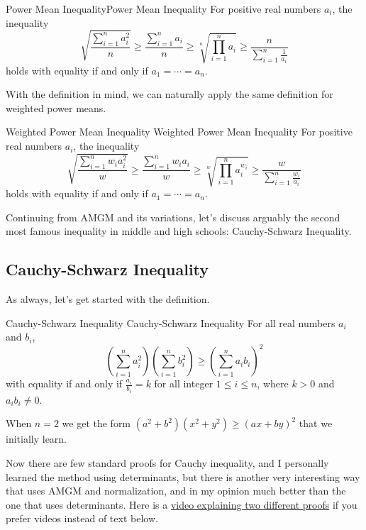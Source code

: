 \documentclass[../../../main.tex]{subfiles}
\begin{document}
\begin{definition}{Power Mean Inequality}{Power Mean Inequality}
For positive real numbers $a_i$, the inequality
\[
\sqrt{ \frac{\sum_{i=1}^n a_i^2}{n} }
\geq \frac{\sum_{i=1}^n a_i}{n}
\geq \sqrt[n]{\prod_{i=1}^n a_i}
\geq \frac{n}{ \sum_{i=1}^n \frac{1}{a_i} }
\]
holds with equality if and only if $a_1 = \cdots = a_n$.
\end{definition}

With the definition in mind, we can naturally apply the same
definition for weighted power means.

\begin{definition}
{Weighted Power Mean Inequality}
{Weighted Power Mean Inequality}
For positive real numbers $a_i$, the inequality
\[
\sqrt{ \frac{\sum_{i=1}^n w_i a_i^2}{w} }
\geq \frac{\sum_{i=1}^n w_i a_i}{w}
\geq \sqrt[w]{\prod_{i=1}^n a_i^{w_i}}
\geq \frac{w}{ \sum_{i=1}^n \frac{w_i}{a_i} }
\]
holds with equality if and only if $a_1 = \cdots = a_n$.
\end{definition}

Continuing from AMGM and its variations, let's discuss arguably the
second most famous inequality in middle and high schools:
Cauchy-Schwarz Inequality.

\subsection{Cauchy-Schwarz Inequality}

As always, let's get started with the definition.

\begin{definition}
{Cauchy-Schwarz Inequality}
{Cauchy-Schwarz Inequality}
For all real numbers $a_i$ and $b_i$,
\[
\left( \sum_{i=1}^n a_i^2 \right) \left( \sum_{i=1}^n b_i^2 \right)
\geq
\left( \sum_{i=1}^n a_i b_i \right)^2
\]
with equality if and only if $\frac{a_i}{b_i} = k$ for all integer
$1 \leq i \leq n$, where $k > 0$ and $a_ib_i \neq 0$.
\end{definition}

When $n = 2$ we get the form $(a^2 + b^2)(x^2 + y^2) \geq (ax + by)^2$
that we initially learn.

Now there are few standard proofs for Cauchy inequality,
and I personally learned the method using determinants,
but there is another very interesting way that uses AMGM and
normalization, and in my opinion much better than the one that
uses determinants. Here is a \href{https://youtu.be/OLUunhebpSg}
{video explaining two different proofs} if you prefer videos
instead of text below.
\end{document}
